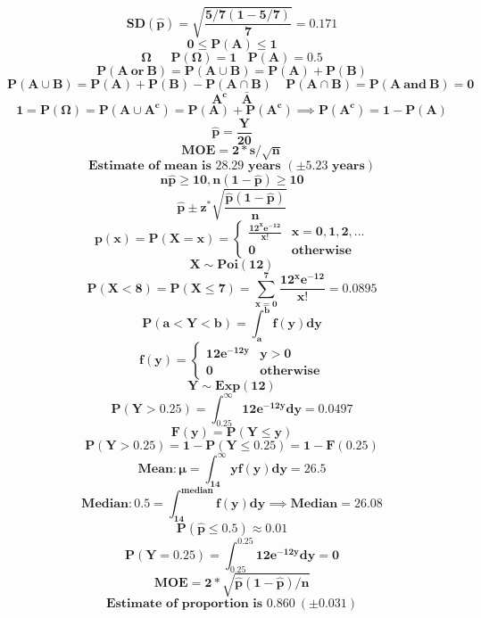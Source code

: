 \documentclass[12pt,portrait,semhelv,semrot]{article}
\begin{document}
{{$$\boldsymbol{SD(\hat{p}) = \sqrt{\frac{5/7(1-5/7)}{7}}=0.171}$$
$$\boldsymbol{0 \leq P(A) \leq 1}$$
$$\boldsymbol{\Omega~~~~~~~P(\Omega) = 1~~~~P(A) = 0.5}$$
$$\boldsymbol{P(A~or~B) = P(A\cup B) = P(A)+P(B)}$$
$$\boldsymbol{P(A\cup B) = P(A)+P(B)- P(A\cap B)~~~~~P(A\cap B) = P(A~and~B) = 0}$$
$$\boldsymbol{A^c~~~~~\bar{A}}$$
$$\boldsymbol{1 = P(\Omega) = P(A\cup A^c) = P(A)+P(A^c) \implies P(A^c) = 1-P(A)}$$
$$\boldsymbol{\hat{p} = \frac{Y}{20}}$$
$$\boldsymbol{MOE = 2*s/\sqrt{n}}$$
$$\boldsymbol{\mbox{Estimate of mean is } 28.29 \mbox{ years } (\pm 5.23 \mbox{ years})}$$
$$\boldsymbol{n\hat{p}\geq 10, n(1-\hat{p})\geq 10}$$  
$$\boldsymbol{\hat{p}\pm z^{*} \sqrt{\frac{\hat{p}(1-\hat{p})}{n}}}$$
$$\boldsymbol{p(x) = P(X=x) = \begin{cases} \frac{12^x e^{-12}}{x!} & x = 0, 1, 2, ... \\ 0 & \mbox{otherwise}\end{cases}}$$
$$\boldsymbol{X\sim Poi(12)}$$
$$\boldsymbol{P(X<8) = P(X\leq 7) = \sum_{x=0}^{7}\frac{12^x e^{-12}}{x!} = 0.0895}$$
$$\boldsymbol{P(a < Y < b) = \int_a^b f(y)dy}$$
$$\boldsymbol{f(y) = \begin{cases} 12e^{-12y} & y > 0 \\ 0 & \mbox{otherwise}\end{cases}}$$
$$\boldsymbol{Y\sim Exp(12)}$$
$$\boldsymbol{P(Y > 0.25) = \int_{0.25}^{\infty} 12e^{-12y}dy = 0.0497}$$
$$\boldsymbol{F(y) = P(Y\leq y)}$$
$$\boldsymbol{P(Y > 0.25) = 1-P(Y\leq 0.25) = 1 - F(0.25)}$$
$$\boldsymbol{Mean: \mu = \int_{14}^{\infty} y f(y)dy = 26.5}$$
$$\boldsymbol{Median:  0.5 = \int_{14}^{median} f(y)dy \implies Median = 26.08}$$
$$\boldsymbol{P(\hat{p}\leq 0.5)\approx 0.01}$$
$$\boldsymbol{P(Y = 0.25) = \int_{0.25}^{0.25} 12e^{-12y}dy = 0}$$
$$\boldsymbol{MOE = 2*\sqrt{\hat{p}(1-\hat{p})/n}}$$
$$\boldsymbol{\mbox{Estimate of proportion is } 0.860 ~(\pm 0.031)}$$
}}
\end{document}
